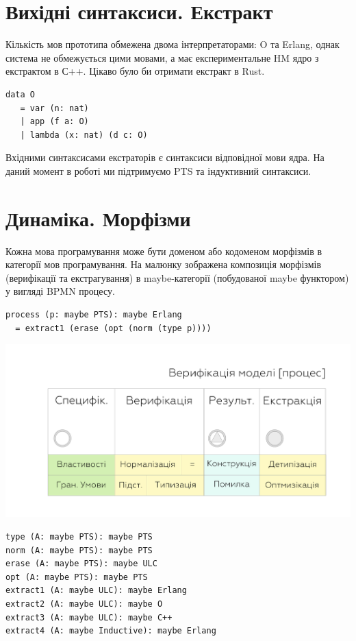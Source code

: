 \section{Вихідні синтаксиси. Екстракт}
Кількість мов прототипа обмежена двома інтерпретаторами: O та Erlang,
однак система не обмежується цими мовами, а має експериментальне HM ядро
з екстрактом в С++. Цікаво було би отримати екстракт в Rust.

\begin{lstlisting}[mathescape=true]
data O
   = var (n: nat)
   | app (f a: O)
   | lambda (x: nat) (d c: O)
\end{lstlisting}

Вхідними синтаксисами екстраторів є синтаксиси відповідної мови ядра.
На даний момент в роботі ми підтримуємо PTS та індуктивний синтаксиси.

\section{Динаміка. Морфізми}

Кожна мова програмування може бути доменом або кодоменом
морфізмів в категорії мов програмування. На малюнку зображена
композиція морфізмів (верифікації та екстрагування)
в maybe-категорії (побудованої maybe функтором) у вигляді BPMN процесу.

\begin{lstlisting}[mathescape=true]
process (p: maybe PTS): maybe Erlang
  = extract1 (erase (opt (norm (type p))))
\end{lstlisting}

\includegraphics[scale=0.18]{dynamic}

\begin{lstlisting}[mathescape=true]
type (A: maybe PTS): maybe PTS
norm (A: maybe PTS): maybe PTS
erase (A: maybe PTS): maybe ULC
opt (A: maybe PTS): maybe PTS
extract1 (A: maybe ULC): maybe Erlang
extract2 (A: maybe ULC): maybe O
extract3 (A: maybe ULC): maybe C++
extract4 (A: maybe Inductive): maybe Erlang
\end{lstlisting}

